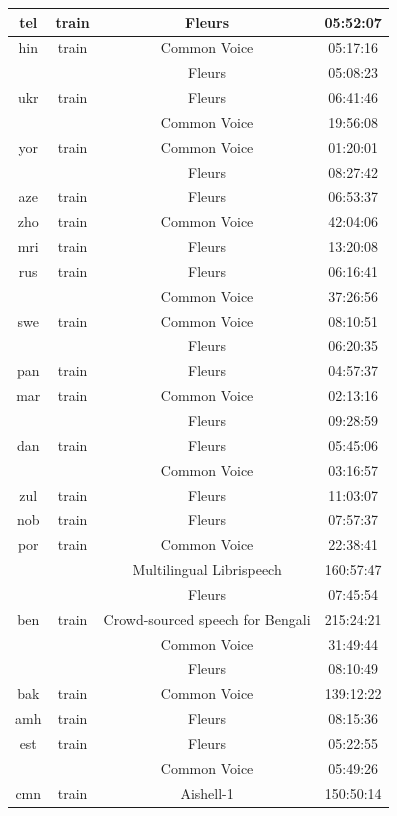 \begin{longtable}{cccc}
tel & train & Fleurs & 05:52:07 \\ \midrule
hin & train & Common Voice & 05:17:16 \\ 
 & & Fleurs & 05:08:23 \\  \midrule
ukr & train & Fleurs & 06:41:46 \\ 
 & & Common Voice & 19:56:08 \\  \midrule 
yor & train & Common Voice & 01:20:01 \\ 
 & & Fleurs & 08:27:42 \\ \midrule
aze & train & Fleurs & 06:53:37 \\  \midrule
zho & train & Common Voice & 42:04:06 \\ \midrule
mri & train & Fleurs & 13:20:08 \\ \midrule
rus & train & Fleurs & 06:16:41 \\ 
 & & Common Voice & 37:26:56 \\ \midrule
swe & train & Common Voice & 08:10:51 \\ 
 & & Fleurs & 06:20:35 \\ \midrule
pan & train & Fleurs & 04:57:37 \\  \midrule
mar & train & Common Voice & 02:13:16 \\ 
 & & Fleurs & 09:28:59 \\ \midrule
dan & train & Fleurs & 05:45:06 \\ 
 & & Common Voice & 03:16:57 \\ \midrule
zul & train & Fleurs & 11:03:07 \\  \midrule
nob & train & Fleurs & 07:57:37 \\  \midrule
por & train & Common Voice & 22:38:41 \\ 
 & & Multilingual Librispeech & 160:57:47 \\ 
 & & Fleurs & 07:45:54 \\ \midrule
ben & train & Crowd-sourced speech for Bengali & 215:24:21 \\ 
 & & Common Voice & 31:49:44 \\ 
 & & Fleurs & 08:10:49 \\ \midrule 
bak & train & Common Voice & 139:12:22 \\  \midrule
amh & train & Fleurs & 08:15:36 \\ \midrule
est & train & Fleurs & 05:22:55 \\ 
 & & Common Voice & 05:49:26 \\ \midrule
cmn & train & Aishell-1 & 150:50:14 \\ 

\end{longtable}

